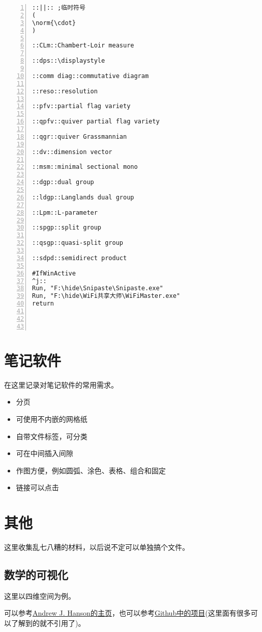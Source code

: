 \documentclass[11pt]{amsart}
\begin{document}
\begin{lstlisting}[numbers=left,numberstyle=\tiny,numbersep=10pt]
::||:: ;临时符号
(
\norm{\cdot} 
)

::CLm::Chambert-Loir measure

::dps::\displaystyle

::comm diag::commutative diagram

::reso::resolution

::pfv::partial flag variety

::qpfv::quiver partial flag variety

::qgr::quiver Grassmannian

::dv::dimension vector

::msm::minimal sectional mono

::dgp::dual group

::ldgp::Langlands dual group

::Lpm::L-parameter

::spgp::split group

::qsgp::quasi-split group

::sdpd::semidirect product

#IfWinActive
^j::  
Run, "F:\hide\Snipaste\Snipaste.exe"
Run, "F:\hide\WiFi共享大师\WiFiMaster.exe"
return




\end{lstlisting}
\section{笔记软件}
在这里记录对笔记软件的常用需求。
\begin{itemize}
\item 分页
\item 可使用不内嵌的网格纸
\item 自带文件标签，可分类
\item 可在中间插入间隙
\item 作图方便，例如圆弧、涂色、表格、组合和固定
\item 链接可以点击
\end{itemize}
\section{其他}
这里收集乱七八糟的材料，以后说不定可以单独搞个文件。
\subsection{数学的可视化}
这里以四维空间为例。

可以参考\href{https://legacy.cs.indiana.edu/~hansona/}{Andrew J. Hanson的主页}，也可以参考\href{https://github.com/wxyhly/4dViewer}{Github中的项目}(这里面有很多可以了解到的就不引用了)。
\end{document}
